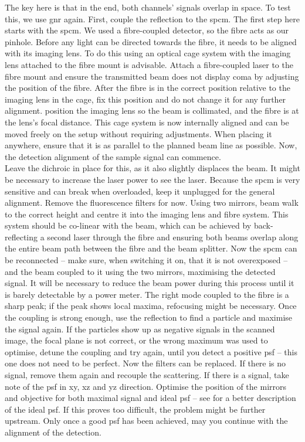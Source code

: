         The key here is that in the end, both channels' signals overlap in space. To test this, we use \gls{gnr} again. First, couple the reflection to the \gls{spcm}. The first step here starts with the \gls{spcm}. We used a fibre-coupled detector, so the fibre acts as our pinhole. Before any light can be directed towards the fibre, it needs to be aligned with its imaging lens. To do this using an optical cage system with the imaging lens attached to the fibre mount is advisable. Attach a fibre-coupled laser to the fibre mount and ensure the transmitted beam does not display \gls{coma} by adjusting the position of the fibre. After the fibre is in the correct position relative to the imaging lens in the cage, fix this position and do not change it for any further alignment. position the imaging lens so the beam is collimated, and the fibre is at the lens's focal distance. This cage system is now internally aligned and can be moved freely on the setup without requiring adjustments. When placing it anywhere, ensure that it is as parallel to the planned beam line as possible. Now, the detection alignment of the sample signal can commence. \\
        Leave the dichroic in place for this, as it also slightly displaces the beam. It might be necessary to increase the laser power to see the laser. Because the \gls{spcm} is very sensitive and can break when overloaded, keep it unplugged for the general alignment. Remove the fluorescence filters for now. Using two mirrors, beam walk to the correct height and centre it into the imaging lens and fibre system. This system should be co-linear with the beam, which can be achieved by back-reflecting a second laser through the fibre and ensuring both beams overlap along the entire beam path between the fibre and the beam splitter. Now the \gls{spcm} can be reconnected -- make sure, when switching it on, that it is not overexposed -- and the beam coupled to it using the two mirrors, maximising the detected signal. It will be necessary to reduce the beam power during this process until it is barely detectable by a power meter. The right mode coupled to the fibre is a sharp peak; if the peak shows local maxima, refocusing might be necessary. Once the coupling is strong enough, use the reflection to find a particle and maximise the signal again. If the particles show up as negative signals in the scanned image, the focal plane is not correct, or the wrong maximum was used to optimise, detune the coupling and try again, until you detect a positive \gls{psf} -- this one does not need to be perfect. Now the \fl filters can be replaced. If there is no \fl signal, remove them again and recouple the scattering. If there is a \fl signal, take note of the \gls{psf} in xy, xz and yz direction. Optimise the position of the mirrors and objective for both maximal signal and ideal \gls{psf} -- see \cite{cole2011measuring} for a better description of the ideal \gls{psf}. If this proves too difficult, the problem might be further upstream. Only once a good \fl \gls{psf} has been achieved, may you continue with the alignment of the \scat detection. \\ 
